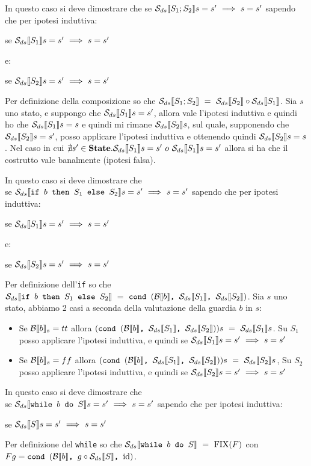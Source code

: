 {     In questo caso si deve dimostrare che
    se $\dsCtxt{S_1;S_2}s=s'~\Longrightarrow~s=s'$ sapendo che per ipotesi
    induttiva:
    \begin{center}
    se $\dsCtxt{S_1}s=s'~\Longrightarrow~s=s'$
    \end{center}
    e:
    \begin{center}
    se $\dsCtxt{S_2}s=s'~\Longrightarrow~s=s'$
    \end{center}
    Per definizione della composizione so che 
    $\dsCtxt{S_1;S_2}~=~\dsCtxt{S_2} \circ \dsCtxt{S_1}$. Sia $s$ uno stato,
    e suppongo che $\dsCtxt{S_1}s=s'$, allora vale l'ipotesi induttiva e quindi
    ho che $\dsCtxt{S_1}s=s$ e quindi mi rimane $\dsCtxt{S_2}s$, sul quale,
    supponendo che $\dsCtxt{S_2}s=s'$, posso applicare l'ipotesi induttiva e
    ottenendo quindi $\dsCtxt{S_2}s=s$. Nel caso in cui 
    $\nexists{}s'\in\states.\dsCtxt{S_1}s=s'~o~\dsCtxt{S_1}s=s'$ allora si ha che il costrutto vale banalmente (ipotesi falsa).

     In questo caso si deve dimostrare che
    \\se $\dsCtxt{\ifABC{b}{S_1}{S_2}}s=s'~\Longrightarrow~s=s'$ sapendo che per
    ipotesi induttiva:
    \begin{center}
    se $\dsCtxt{S_1}s=s'~\Longrightarrow~s=s'$
    \end{center}
    e:
    \begin{center}
    se $\dsCtxt{S_2}s=s'~\Longrightarrow~s=s'$
    \end{center}
    Per definizione dell'\texttt{if} so che 
    $\dsCtxt{\ifABC{b}{S_1}{S_2}}~=~\cond{b}{\dsCtxt{S_1}}{\dsCtxt{S_2}}$. Sia
    $s$ uno stato, abbiamo 2 casi a seconda della valutazione della guardia $b$
    in $s$:
    \begin{itemize}
    \item Se $\evalBbs{b}{s}=tt$ allora $(\cond{b}{\dsCtxt{S_1}}{\dsCtxt{S_2}})s
    ~=~\dsCtxt{S_1}s$. Su $S_1$ posso applicare l'ipotesi induttiva, e quindi
    se $\dsCtxt{S_1}s=s'~\Longrightarrow~s=s'$
    
    \item Se $\evalBbs{b}{s}=ff$ allora $(\cond{b}{\dsCtxt{S_1}}{\dsCtxt{S_2}})s
    ~=~\dsCtxt{S_2}s$, Su $S_2$ posso applicare l'ipotesi induttiva, e quindi
    se $\dsCtxt{S_2}s=s'~\Longrightarrow~s=s'$
    \end{itemize}

     In questo caso si deve dimostrare che
    \\se $\dsCtxt{\wbS{b}{S}}s=s'~\Longrightarrow~s=s'$ sapendo che per
    ipotesi induttiva:
    \begin{center}
    se $\dsCtxt{S}s=s'~\Longrightarrow~s=s'$
    \end{center}
    Per definizione del \texttt{while} so che 
    $\dsCtxt{\wbS{b}{S}}~=~\fixp{F}$ con $F g = \cond{b}{g \circ \Sds}{\idDS}$.
    
}
